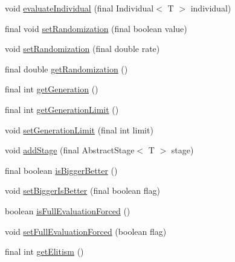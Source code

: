 \begin{CompactItemize}
\item 
void \hyperlink{classjenes_1_1_genetic_algorithm_3_01_t_01extends_01_chromosome_01_4_17d1c99e638312a18394c6d76dedb2f3}{evaluateIndividual} (final Individual$<$ T $>$ individual)
\item 
final void \hyperlink{classjenes_1_1_genetic_algorithm_3_01_t_01extends_01_chromosome_01_4_cf14a43bc2c8bed69aa0334b18d58ba7}{setRandomization} (final boolean value)
\item 
void \hyperlink{classjenes_1_1_genetic_algorithm_3_01_t_01extends_01_chromosome_01_4_78cb20ba6256d06e7cd04696e697cc4e}{setRandomization} (final double rate)
\item 
final double \hyperlink{classjenes_1_1_genetic_algorithm_3_01_t_01extends_01_chromosome_01_4_dd75e6182615af89791921472d2fbc9f}{getRandomization} ()
\item 
final int \hyperlink{classjenes_1_1_genetic_algorithm_3_01_t_01extends_01_chromosome_01_4_25602ec654959a43a64f12e92251cb47}{getGeneration} ()
\item 
final int \hyperlink{classjenes_1_1_genetic_algorithm_3_01_t_01extends_01_chromosome_01_4_c6eceff2ad4a055f3c6047fb4c272ef3}{getGenerationLimit} ()
\item 
void \hyperlink{classjenes_1_1_genetic_algorithm_3_01_t_01extends_01_chromosome_01_4_1e4d04de7cf34838296ad6745ac046f5}{setGenerationLimit} (final int limit)
\item 
void \hyperlink{classjenes_1_1_genetic_algorithm_3_01_t_01extends_01_chromosome_01_4_a0ab85fdb0cb1880a469044affbb32e7}{addStage} (final AbstractStage$<$ T $>$ stage)
\item 
final boolean \hyperlink{classjenes_1_1_genetic_algorithm_3_01_t_01extends_01_chromosome_01_4_34e6ea627850ec240d4c0bba39170d4b}{isBiggerBetter} ()
\item 
void \hyperlink{classjenes_1_1_genetic_algorithm_3_01_t_01extends_01_chromosome_01_4_fcc4f944d2d47d757e177a22a660bfd3}{setBiggerIsBetter} (final boolean flag)
\item 
boolean \hyperlink{classjenes_1_1_genetic_algorithm_3_01_t_01extends_01_chromosome_01_4_7305deb720716287d256832f0bd44785}{isFullEvaluationForced} ()
\item 
void \hyperlink{classjenes_1_1_genetic_algorithm_3_01_t_01extends_01_chromosome_01_4_9fe6f2d66ffcbce1233194871cdfc5ae}{setFullEvaluationForced} (boolean flag)
\item 
final int \hyperlink{classjenes_1_1_genetic_algorithm_3_01_t_01extends_01_chromosome_01_4_8bbf6df4fc231cfc88a7e879d2bbf814}{getElitism} ()

\end{CompactItemize}
